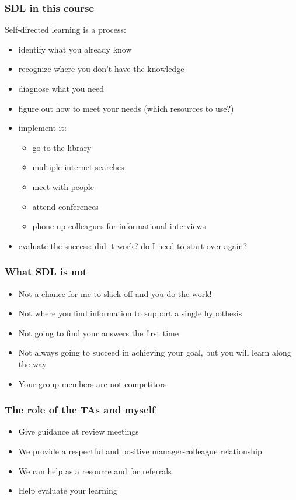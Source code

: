 \begin{frame}\frametitle{SDL in this course}
	Self-directed learning is a process: 
	\begin{itemize}
		\item	identify what you already know
		\item	recognize where you don't have the knowledge
		\item	diagnose what you need
		\item	figure out how to meet your needs (which resources to use?)
		\item	implement it: 
		\begin{itemize}
			\item	go to the library
			\item	multiple internet searches
			\item	meet with people
			\item	attend conferences
			\item	phone up colleagues for informational interviews
		\end{itemize}
		\item	evaluate the success: did it work? do I need to start over again?
	\end{itemize}
\end{frame}

\begin{frame}\frametitle{What SDL is not}
	\begin{itemize}
		\item	Not a chance for me to slack off and you do the work!
		\item	Not where you find information to support a single hypothesis {}
		\item	Not going to find your answers the first time
		\item	Not always going to succeed in achieving your goal, but you will learn along the way
		\item	Your group members are not competitors
	\end{itemize}
\end{frame}

\begin{frame}\frametitle{The role of the TAs and myself}
	\begin{itemize}
		\item	Give guidance at review meetings
		\item	We provide a respectful and positive manager-colleague relationship
		\item	We can help as a resource and for referrals
		\item	Help evaluate your learning	
	\end{itemize}	
\end{frame}

